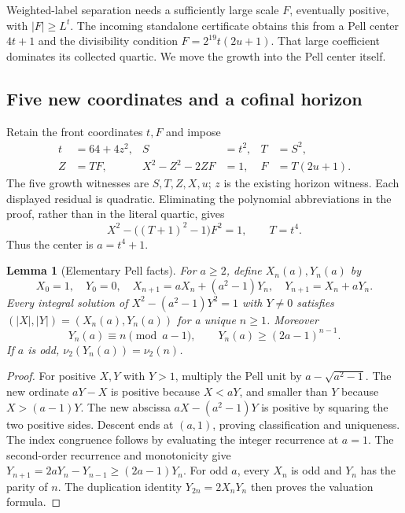 \documentclass[10pt,letterpaper]{article}
\newtheorem{lemma}[theorem]{Lemma}
\theoremstyle{remark}\newtheorem{remark}[theorem]{Remark}
\newcommand{\vp}{\nu_2}
\begin{document}
Weighted-label separation needs a sufficiently large scale $F$, eventually
positive, with $|F|\ge L^t$. The incoming standalone certificate obtains
this from a Pell center $4t+1$ and the divisibility condition
$F=2^{19}t(2u+1)$. That large coefficient dominates its collected quartic.
We move the growth into the Pell center itself.

\subsection{Five new coordinates and a cofinal horizon}

Retain the front coordinates $t,F$ and impose
\begin{equation}\label{eq:newgrowth}
\boxed{\begin{aligned}
 t&=64+4z^2, & S&=t^2, & T&=S^2,\\
 Z&=TF, & X^2-Z^2-2ZF&=1, & F&=T(2u+1).
\end{aligned}}
\end{equation}
The five growth witnesses are $S,T,Z,X,u$; $z$ is the existing horizon
witness. Each displayed residual is quadratic. Eliminating the polynomial
abbreviations in the proof, rather than in the literal quartic, gives
\[
 X^2-\bigl((T+1)^2-1\bigr)F^2=1,\qquad T=t^4.
\]
Thus the center is $a=t^4+1$.

\begin{lemma}[Elementary Pell facts]\label{lem:pell}
For $a\ge2$, define $X_n(a),Y_n(a)$ by
\[
 X_0=1,\quad Y_0=0,\quad
 X_{n+1}=aX_n+(a^2-1)Y_n,\quad Y_{n+1}=X_n+aY_n.
\]
Every integral solution of $X^2-(a^2-1)Y^2=1$ with $Y\ne0$ satisfies
$(|X|,|Y|)=(X_n(a),Y_n(a))$ for a unique $n\ge1$. Moreover
\[
 Y_n(a)\equiv n\pmod{a-1},\qquad
 Y_n(a)\ge(2a-1)^{n-1}.
\]
If $a$ is odd, $\vp(Y_n(a))=\vp(n)$.
\end{lemma}
\begin{proof}
For positive $X,Y$ with $Y>1$, multiply the Pell unit by
$a-\sqrt{a^2-1}$. The new ordinate $aY-X$ is positive because $X<aY$,
and smaller than $Y$ because $X>(a-1)Y$. The new abscissa
$aX-(a^2-1)Y$ is positive by squaring the two positive sides. Descent
ends at $(a,1)$, proving classification and uniqueness. The index
congruence follows by evaluating the integer recurrence at $a=1$.
The second-order recurrence and monotonicity give
$Y_{n+1}=2aY_n-Y_{n-1}\ge(2a-1)Y_n$. For odd $a$, every $X_n$ is odd
and $Y_n$ has the parity of $n$. The duplication identity
$Y_{2n}=2X_nY_n$ then proves the valuation formula.
\end{proof}
\end{document}
